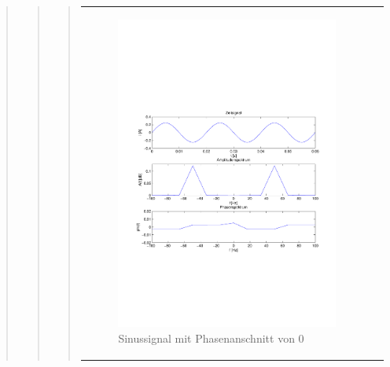 \begin{quote}
\begin{quote}
\begin{quote}
\begin{center}
\begin{tabular}{ll}
\begin{minipage}{0.6\textwidth}
                        \begin{figure}[H]
                            \label{fig:}
                            \includegraphics[scale=0.5, trim = 2cm 7cm 1.5cm 8.5cm, clip]{./Bilder/Phasenanschnitt08pi.pdf}
                            \caption{Sinussignal mit Phasenanschnitt von $0$}
                        \end{figure}
    
                    \end{minipage}
                    \begin{minipage}{0.6\textwidth}
    

\end{minipage}
\end{tabular}
\end{center}
\end{quote}
\end{quote}
\end{quote}
